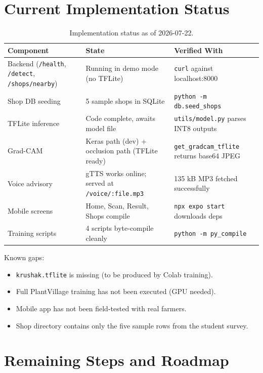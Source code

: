 \documentclass[11pt]{article}
\begin{document}
\section{Current Implementation Status}

\begin{table}[h]
\centering
\small
\begin{tabular}{lll}
\toprule
\textbf{Component} & \textbf{State} & \textbf{Verified With} \\
\midrule
Backend (\texttt{/health}, \texttt{/detect}, \texttt{/shops/nearby}) & Running in demo mode (no TFLite) & \texttt{curl} against localhost:8000 \\
Shop DB seeding & 5 sample shops in SQLite & \texttt{python -m db.seed\_shops} \\
TFLite inference & Code complete, awaits model file & \texttt{utils/model.py} parses INT8 outputs \\
Grad-CAM & Keras path (dev) + occlusion path (TFLite ready) & \texttt{get\_gradcam\_tflite} returns base64 JPEG \\
Voice advisory & gTTS works online; served at \texttt{/voice/:file.mp3} & 135 kB MP3 fetched successfully \\
Mobile screens & Home, Scan, Result, Shops compile & \texttt{npx expo start} downloads deps \\
Training scripts & 4 scripts byte-compile cleanly & \texttt{python -m py\_compile} \\
\bottomrule
\end{tabular}
\caption{Implementation status as of 2026-07-22.}
\end{table}

\noindent Known gaps:
\begin{itemize}
    \item \texttt{krushak.tflite} is missing (to be produced by Colab training).
    \item Full PlantVillage training has not been executed (GPU needed).
    \item Mobile app has not been field-tested with real farmers.
    \item Shop directory contains only the five sample rows from the student survey.
\end{itemize}

\section{Remaining Steps and Roadmap}
\end{document}
